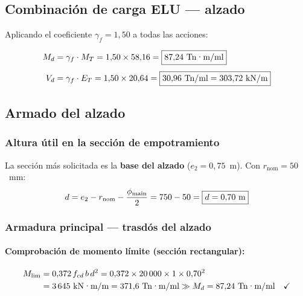 \subsection{Combinación de carga ELU — alzado}
\label{subsec:elu_fuste}

Aplicando el coeficiente $\gamma_f = 1{,}50$ a todas las acciones:

\begin{align}
  M_d &= \gamma_f \cdot M_T = 1{,}50 \times 58{,}16
       = \boxed{87{,}24~\text{Tn·m/ml}}
  \label{eq:Md_fuste} \\[4pt]
  V_d &= \gamma_f \cdot E_T = 1{,}50 \times 20{,}64
       = \boxed{30{,}96~\text{Tn/ml} = 303{,}72~\text{kN/m}}
  \label{eq:Vd_fuste}
\end{align}

\subsection{Armado del alzado}
\label{subsec:armado_fuste}

\subsubsection{Altura útil en la sección de empotramiento}

La sección más solicitada es la \textbf{base del alzado}
($e_2 = 0{,}75$~m). Con $r_{\mathrm{nom}} = 50$~mm:
\[
  d = e_2 - r_{\mathrm{nom}} - \frac{\phi_{\mathrm{main}}}{2}
    = 750 - 50 = \boxed{d = 0{,}70~\text{m}}
\]

\subsubsection{Armadura principal — trasdós del alzado}

\paragraph{Comprobación de momento límite (sección rectangular):}
\begin{align}
  M_{\mathrm{lim}} &= 0{,}372\,f_{cd}\,b\,d^2
    = 0{,}372 \times 20\,000 \times 1 \times 0{,}70^2 \notag \\
    &= 3\,645~\text{kN·m/m} = 371{,}6~\text{Tn·m/ml}
    \gg M_d = 87{,}24~\text{Tn·m/ml} \quad\checkmark
\end{align}

